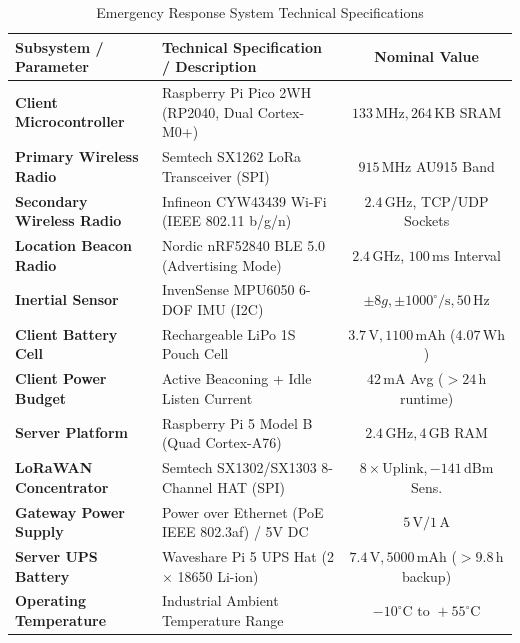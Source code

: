 \begin{table}[htbp]
    \centering
    \caption{Emergency Response System Technical Specifications}
    \label{tab:system_specs}
    \begin{tabularx}{\textwidth}{l X c}
        \toprule
        \textbf{Subsystem / Parameter} & \textbf{Technical Specification / Description} & \textbf{Nominal Value} \\
        \midrule
        \textbf{Client Microcontroller} & Raspberry Pi Pico 2WH (RP2040, Dual Cortex-M0+) & $133\,\text{MHz}, 264\,\text{KB}$ SRAM \\
        \textbf{Primary Wireless Radio} & Semtech SX1262 LoRa Transceiver (SPI) & $915\,\text{MHz}$ AU915 Band \\
        \textbf{Secondary Wireless Radio}& Infineon CYW43439 Wi-Fi (IEEE 802.11 b/g/n) & $2.4\,\text{GHz}$, TCP/UDP Sockets \\
        \textbf{Location Beacon Radio} & Nordic nRF52840 BLE 5.0 (Advertising Mode) & $2.4\,\text{GHz}$, $100\,\text{ms}$ Interval \\
        \textbf{Inertial Sensor} & InvenSense MPU6050 6-DOF IMU (I2C) & $\pm 8g, \pm 1000^\circ/\text{s}, 50\,\text{Hz}$ \\
        \textbf{Client Battery Cell} & Rechargeable LiPo 1S Pouch Cell & $3.7\,\text{V}, 1100\,\text{mAh}$ ($4.07\,\text{Wh}$) \\
        \textbf{Client Power Budget} & Active Beaconing + Idle Listen Current & $42\,\text{mA}$ Avg ($>24\,\text{h}$ runtime) \\
        \textbf{Server Platform} & Raspberry Pi 5 Model B (Quad Cortex-A76) & $2.4\,\text{GHz}, 4\,\text{GB}$ RAM \\
        \textbf{LoRaWAN Concentrator} & Semtech SX1302/SX1303 8-Channel HAT (SPI) & $8\times \text{Uplink}, -141\,\text{dBm}$ Sens. \\
        \textbf{Gateway Power Supply} & Power over Ethernet (PoE IEEE 802.3af) / 5V DC & $5\,\text{V} / 1\,\text{A}$ \\
        \textbf{Server UPS Battery} & Waveshare Pi 5 UPS Hat (2$\times$ 18650 Li-ion) & $7.4\,\text{V}, 5000\,\text{mAh}$ ($>9.8\,\text{h}$ backup) \\
        \textbf{Operating Temperature} & Industrial Ambient Temperature Range & $-10^\circ\text{C to } +55^\circ\text{C}$ \\
        \bottomrule
    \end{tabularx}
\end{table}

